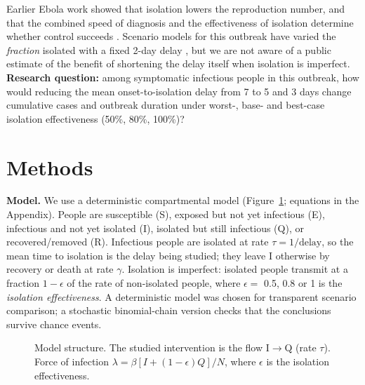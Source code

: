 \documentclass[10pt,a4paper]{article}
\begin{document}
Earlier Ebola work showed that isolation lowers the reproduction number, and that the combined speed of diagnosis and the effectiveness of isolation determine whether control succeeds \cite{chowell}. Scenario models for this outbreak have varied the \emph{fraction} isolated with a fixed 2-day delay \cite{mooring}, but we are not aware of a public estimate of the benefit of shortening the delay itself when isolation is imperfect. \textbf{Research question:} among symptomatic infectious people in this outbreak, how would reducing the mean onset-to-isolation delay from 7 to 5 and 3 days change cumulative cases and outbreak duration under worst-, base- and best-case isolation effectiveness (50\%, 80\%, 100\%)?

\section{Methods}
\textbf{Model.} We use a deterministic compartmental model (Figure~\ref{fig:model}; equations in the Appendix). People are susceptible (S), exposed but not yet infectious (E), infectious and not yet isolated (I), isolated but still infectious (Q), or recovered/removed (R). Infectious people are isolated at rate $\tau=1/\text{delay}$, so the mean time to isolation is the delay being studied; they leave I otherwise by recovery or death at rate $\gamma$. Isolation is imperfect: isolated people transmit at a fraction $1-\epsilon$ of the rate of non-isolated people, where $\epsilon=$ 0.5, 0.8 or 1 is the \emph{isolation effectiveness}. A deterministic model was chosen for transparent scenario comparison; a stochastic binomial-chain version checks that the conclusions survive chance events.

\begin{figure}[h]
\centering
{}
\caption{Model structure. The studied intervention is the flow I$\to$Q (rate $\tau$). Force of infection $\lambda=\beta[I+(1-\epsilon)Q]/N$, where $\epsilon$ is the isolation effectiveness.}\label{fig:model}
\end{figure}
\end{document}
